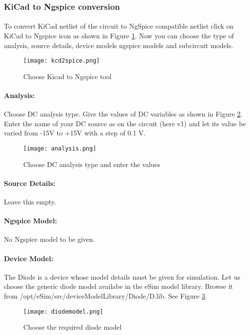 \subsubsection{KiCad to Ngspice conversion}

\paragraph{} To convert KiCad netlist of the circuit to NgSpice
compatible netlist click on KiCad to Ngspice icon as shown in Figure \ref{kcd2spice}.  Now you can choose the type of analysis, source details, device models ngspice models and subcircuit models.


\begin{figure}[H]
\centering
\texttt{[image: kcd2spice.png]}
\caption{Choose Kicad to Ngspice tool}
\label{kcd2spice}
\end{figure}


\paragraph{Analysis:}Choose DC analysis type. Give the values of DC variables as shown in Figure \ref{analysis}. Enter the name of your DC source as on the circuit (here v1) and let its value be varied from -15V to +15V with a step of 0.1 V.

\begin{figure}[H]
\centering
\texttt{[image: analysis.png]}
\caption{Choose DC analysis type and enter the values}
\label{analysis}
\end{figure}

\paragraph{Source Details:} Leave this empty.

\paragraph{Ngspice Model:} No Ngspice model to be given.

\paragraph{Device Model:} The Diode is a device whose model details must be given for simulation. Let us choose the generic diode model availabe in the eSim model library. Browse it from /opt/eSim/src/deviceModelLibrary/Diode/D.lib. See Figure \ref{diodemodel}.
\begin{figure}[H]
\centering
\texttt{[image: diodemodel.png]}
\caption{Choose the required diode model}
\label{diodemodel}
\end{figure}

